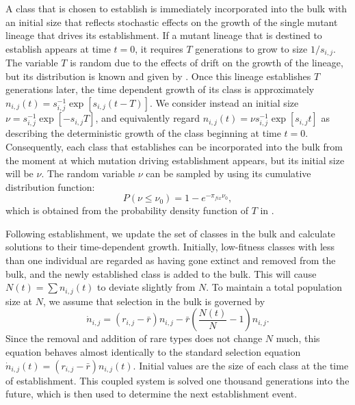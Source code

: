 \documentclass[9pt,twocolumn,twoside]{gsajnl}
\begin{document}
A class that is chosen to establish is immediately incorporated into the bulk with an initial size that reflects stochastic effects on the growth of the single mutant lineage that drives its establishment. If a mutant lineage that is destined to establish appears at time $t=0$, it requires $T$ generations to grow to size $1/s_{i,j}$. The variable $T$ is random due to the effects of drift on the growth of the lineage, but its distribution is known and given by \cite[Equation 12]{desai2007beneficial}.  Once this lineage establishes $T$ generations later, the time dependent growth of its class is approximately $n_{i,j}(t) =s_{i,j}^{-1} \exp[{s_{i,j}(t-T)}]$. We consider instead an initial size  $\nu = s_{i,j}^{-1}\exp[-s_{i,j}T]$, and equivalently regard $n_{i,j}(t) = \nu s_{i,j}^{-1} \exp[{s_{i,j}t}] $ as describing the deterministic growth of the class beginning at time $t=0$. Consequently, each class that establishes can be incorporated into the bulk from the moment at which mutation driving establishment appears, but its initial size will be $\nu$. The random variable $\nu$ can be sampled by using its cumulative distribution function:
\begin{equation}\label{eq:3}
P(\nu \leq \nu_0) = 1- e^{-\pi_{fix} \nu_0},
\end{equation}
which is obtained from the probability density function of  $T$ in \cite[Equation 12]{desai2007beneficial}.

Following establishment, we update the set of classes in the bulk and calculate solutions to their time-dependent growth. Initially, low-fitness classes with less than one individual are regarded as having gone extinct and removed from the bulk, and the newly established class is added to the bulk. This will cause $N(t)=\sum n_{i,j}(t)$ to deviate slightly from $N$. To  maintain a total population size at $N$, we assume that selection in the bulk is governed by \cite[p.133]{Crow1970}
\[ \dot{n}_{i,j} = (r_{i,j}-\bar{r})n_{i,j} - \bar{r}\left (\frac{N(t)}{N}-1 \right)n_{i,j}. \] 
Since the removal and addition of rare types does not change $N$ much, this equation behaves almost identically to the standard selection equation $\dot{n}_{i,j}(t) =(r_{i,j}-\bar{r})n_{i,j}(t)$. Initial values are the size of each class at the time of establishment. This coupled system is solved one thousand generations into the future, which is then used to determine the next establishment event. 
\end{document}
